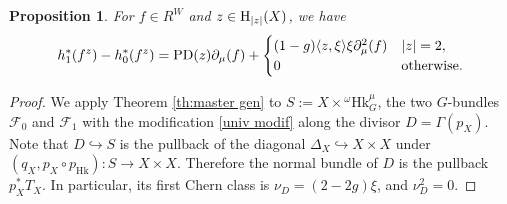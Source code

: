 \documentclass[reqno]{amsart}
\numberwithin{equation}{subsection}
\newtheorem{prop}[subsubsection]{Proposition}
\theoremstyle{definition}
\newcommand\cF{\mathcal{F}}
\newcommand\Hk{\mathrm{Hk}}
\renewcommand{\j}[1]{\langle{#1}\rangle}
\renewcommand\c\circ
\newcommand{\homog}[2]{\textup{H}_{#1}({#2})}  %
\newcommand{\incl}{\hookrightarrow}
\newcommand\G\Gamma
\newcommand\D\Delta
\newcommand{\om}{\omega}
\newcommand\PD{\textup{PD}}
\newcommand\pl{\partial}
\begin{document}
\begin{prop}\label{p:master eqn}
For $f\in R^{W}$ and $z\in \homog{|z|}{X}$, we have
\begin{equation*}
h_{1}^{*}(f^{z})-h_{0}^{*}(f^{z})=\PD(z)\pl_{\mu}(f)+\begin{cases}(1-g)\j{z,\xi}\xi\pl_{\mu}^{2}(f) & |z|=2, \\ 
0 & \mbox{otherwise}.\end{cases}
\end{equation*}

\end{prop}
\begin{proof} We apply Theorem \ref{th:master gen} to $S:=X\times {}^{\om} \Hk^{\mu}_G$, the two $G$-bundles $\cF_{0}$ and $\cF_{1}$ with the modification \eqref{univ modif} along the divisor $D=\G(p_{X})$. Note that $D\incl S$ is the pullback of the diagonal $\D_{X}\incl X\times X$ under $(q_{X},p_{X}\c p_{\Hk}): S\to X\times X$. Therefore the normal bundle of $D$ is the pullback $p_{X}^{*}T_{X}$. In particular, its first Chern class is $\nu_{D}=(2-2g)\xi$, and $\nu_{D}^{2}=0$. 


\end{proof}
\end{document}
